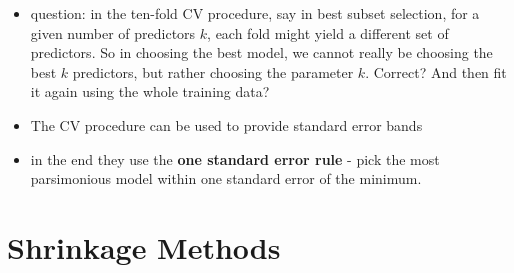 \documentclass[a4paper]{report}
\newcommand{\red}{\color{red}}
\newcommand{\<}{\textless}
\renewcommand{\>}{\textgreater}
\begin{document}
\begin{itemize}
  \item {\red question: in the ten-fold CV procedure, say in best subset selection, for a given number of predictors $k$, each fold might yield a different set of predictors. So in choosing the best model, we cannot really be choosing the best $k$ predictors, but rather choosing the parameter $k$. Correct? And then fit it again using the whole training data?}
  \item The CV procedure can be used to provide standard error bands
  \item in the end they use the  {\bf one standard error rule} - pick the most parsimonious model within one standard error of the minimum.
\end{itemize}

\section{Shrinkage Methods}
\end{document}
